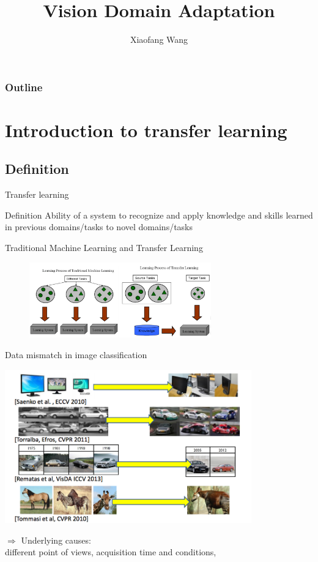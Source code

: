\documentclass{beamer}
\author{Xiaofang Wang}
\title{Vision Domain Adaptation}
\institute{Ecole Centrale de Lyon \\ LIRIS}
\begin{document}
\begin{frame}
\titlepage
\end{frame}
\begin{frame}
\frametitle{Outline} 
\tableofcontents 
\end{frame}
\section{Introduction to transfer learning} 
\subsection{Definition}
\begin{frame}{Transfer learning}
\begin{block}{Definition}
Ability of a system to recognize and apply knowledge and skills learned in
previous domains/tasks to novel domains/tasks 
\end{block}
\begin{block}{Traditional
Machine Learning and Transfer Learning}
\begin{figure}
\includegraphics[width=0.7\textwidth]{figs/f3.png}
\end{figure}
\end{block}
\end{frame}
 \begin{frame}{Data mismatch in  image classification}
    \begin{center}
  \includegraphics[width=0.8\textwidth]{figs/f5.png}
    \end{center}
$\Rightarrow$  Underlying causes: \\
different point of views, acquisition time and conditions,
\end{frame}
\end{document}
